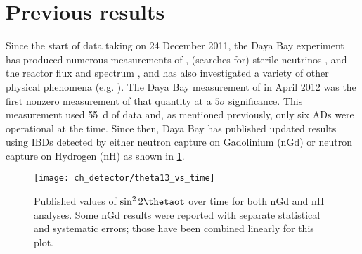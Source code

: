 \section{Previous results}

Since the start of data taking on 24 December 2011,
the Daya Bay experiment has produced numerous measurements of
\thetaot{}, (searches for) sterile neutrinos \cite{dyb_sterile2020},
and the reactor \nuebar{} flux and spectrum \cite{dyb_spec_decomp2019},
and has also investigated
a variety of other physical phenomena (e.g. \cite{dyb_cpt2018}).
The Daya Bay measurement of \thetaot{} in April 2012
was the first nonzero measurement of that quantity
at a $5\sigma$ significance.
This measurement used \SI{55}{\day} of \nuebar{} data
and, as mentioned previously, only six ADs were operational at the time.
Since then, Daya Bay has published updated results using IBDs detected by
either neutron capture on Gadolinium (nGd)
\cite{ngd2012,ngd2013,ngd2014,ngd2015,ngd2016,ngd2018}
or neutron capture on Hydrogen (nH)
\cite{nh2014,nh2016}
as shown in \cref{fig:theta13_vs_t}.

\begin{figure}
    \centering
    \texttt{[image: ch\_detector/theta13\_vs\_time]}
    \caption{
        Published values of $\sin^{2}2\thetaot$ over time
        for both nGd and nH analyses.
        Some nGd results were reported with separate statistical
        and systematic errors;
        those have been combined linearly for this plot.
    }
    \label{fig:theta13_vs_t}
\end{figure}
